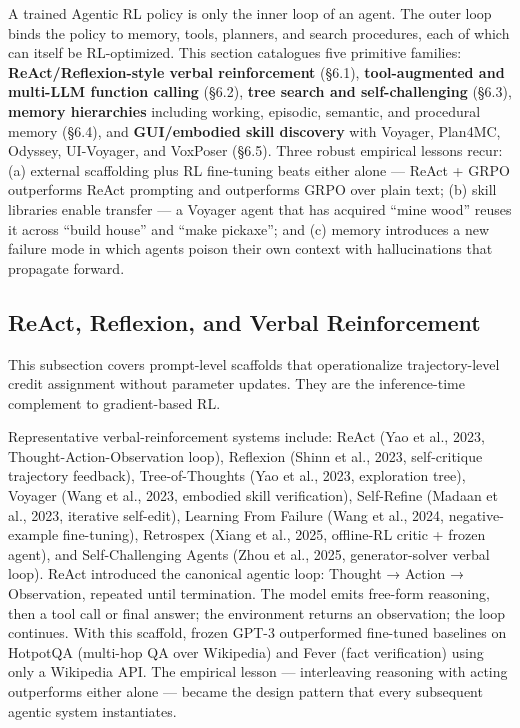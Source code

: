 \documentclass{article}
\begin{document}
A trained Agentic RL policy is only the inner loop of an agent. The outer loop binds the policy to memory, tools, planners, and search procedures, each of which can itself be RL-optimized. This section catalogues five primitive families: \textbf{ReAct/Reflexion-style verbal reinforcement} (§6.1), \textbf{tool-augmented and multi-LLM function calling} (§6.2), \textbf{tree search and self-challenging} (§6.3), \textbf{memory hierarchies} including working, episodic, semantic, and procedural memory (§6.4), and \textbf{GUI/embodied skill discovery} with Voyager, Plan4MC, Odyssey, UI-Voyager, and VoxPoser (§6.5). Three robust empirical lessons recur: (a) external scaffolding plus RL fine-tuning beats either alone --- ReAct + GRPO outperforms ReAct prompting and outperforms GRPO over plain text; (b) skill libraries enable transfer --- a Voyager agent that has acquired ``mine wood'' reuses it across ``build house'' and ``make pickaxe''; and (c) memory introduces a new failure mode in which agents poison their own context with hallucinations that propagate forward.

\subsection{ReAct, Reflexion, and Verbal Reinforcement}\label{react-reflexion-and-verbal-reinforcement}

This subsection covers prompt-level scaffolds that operationalize trajectory-level credit assignment without parameter updates. They are the inference-time complement to gradient-based RL.

Representative verbal-reinforcement systems include: ReAct (Yao et al., 2023, Thought-Action-Observation loop), Reflexion (Shinn et al., 2023, self-critique trajectory feedback), Tree-of-Thoughts (Yao et al., 2023, exploration tree), Voyager (Wang et al., 2023, embodied skill verification), Self-Refine (Madaan et al., 2023, iterative self-edit), Learning From Failure (Wang et al., 2024, negative-example fine-tuning), Retrospex (Xiang et al., 2025, offline-RL critic + frozen agent), and Self-Challenging Agents (Zhou et al., 2025, generator-solver verbal loop). ReAct \citep{yao20232023} introduced the canonical agentic loop: Thought → Action → Observation, repeated until termination. The model emits free-form reasoning, then a tool call or final answer; the environment returns an observation; the loop continues. With this scaffold, frozen GPT-3 outperformed fine-tuned baselines on HotpotQA (multi-hop QA over Wikipedia) and Fever (fact verification) using only a Wikipedia API. The empirical lesson --- interleaving reasoning with acting outperforms either alone --- became the design pattern that every subsequent agentic system instantiates.
\end{document}
